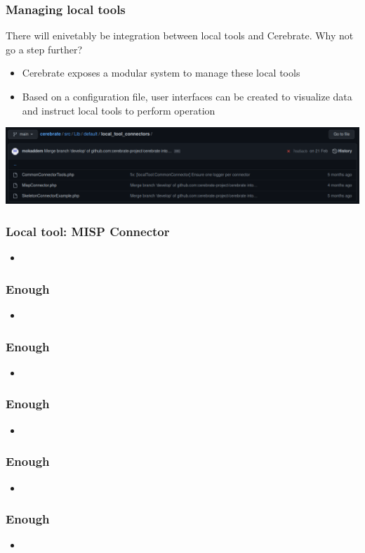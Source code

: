 \begin{frame}
\frametitle{Managing local tools}
There will enivetably be integration between local tools and Cerebrate. Why not go a step further?
    \begin{itemize}
        \item Cerebrate exposes a modular system to manage these local tools
        \item Based on a configuration file, user interfaces can be created to visualize data and instruct local tools to perform operation
    \end{itemize}
    \begin{center}
        \includegraphics[width=0.7\linewidth]{pictures/github-local-tool.png}
    \end{center}
\end{frame}

\begin{frame}
\frametitle{Local tool: MISP Connector}
    \begin{itemize}
        \item {}
    \end{itemize}
\end{frame}

\begin{frame}
\frametitle{Enough}
    \begin{itemize}
        \item {}
    \end{itemize}
\end{frame}

\begin{frame}
\frametitle{Enough}
    \begin{itemize}
        \item {}
    \end{itemize}
\end{frame}

\begin{frame}
\frametitle{Enough}
    \begin{itemize}
        \item {}
    \end{itemize}
\end{frame}

\begin{frame}
\frametitle{Enough}
    \begin{itemize}
        \item {}
    \end{itemize}
\end{frame}

\begin{frame}
\frametitle{Enough}
    \begin{itemize}
        \item {}
    \end{itemize}
\end{frame}

